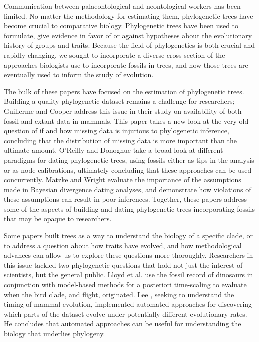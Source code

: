 \documentclass[]{article}
\begin{document}
Communication between palaeontological and neontological workers has been limited. No matter the methodology for estimating them, phylogenetic trees have become crucial to comparative biology. Phylogenetic trees have been used to formulate, give evidence in favor of or against hypotheses about the evolutionary history of groups and traits. Because the field of phylogenetics is both crucial and rapidly-changing, we sought to incorporate a diverse cross-section of the approaches biologists use to incorporate fossils in trees, and how those trees are eventually used to inform the study of evolution. \par

The bulk of these papers have focused on the estimation of phylogenetic trees. Building a quality phylogenetic dataset remains a challenge for researchers; Guillerme and Cooper\cite{guillerme2016assessment} address this issue in their study on availability of both fossil and extant data in mammals. This paper takes a new look at the very old question of if and how missing data is injurious to phylogenetic inference, concluding that the distribution of missing data is more important than the ultimate amount. O'Reilly and Donoghue \cite{o2016tips} take a broad look at different paradigms for dating phylogenetic trees, using fossils either as tips in the analysis or as node calibrations, ultimately concluding that these approaches can be used concurrently. Matzke and Wright \cite{matzke2016inferring} evaluate the importance of the assumptions made in Bayesian divergence dating analyses, and demonstrate how violations of these assumptions can result in poor inferences. Together, these papers address some of the aspects of building and dating phylogenetic trees incorporating fossils that may be opaque to researchers. \par

Some papers built trees as a way to understand the biology of a specific clade, or to address a question about how traits have evolved, and how methodological advances can allow us to explore these questions more thoroughly. Researchers in this issue tackled two phylogenetic questions that hold not just the interest of scientists, but the general public. Lloyd et al. \cite{lloyd2016probabilistic} use the fossil record of dinosaurs in conjunction with model-based methods for a posteriori time-scaling to evaluate when the bird clade, and flight, originated. Lee \cite{lee2016multiple}, seeking to understand the timing of mammal evolution, implemented automated approaches for discovering which parts of the dataset evolve under potentially different evolutionary rates. He  concludes that automated approaches can be useful for understanding the biology that underlies phylogeny.\par 
\end{document}
